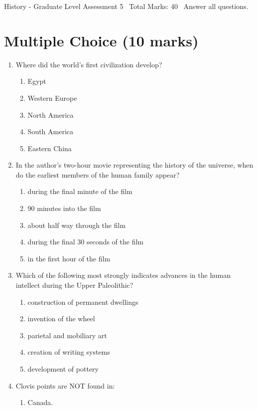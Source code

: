 \documentclass[12pt]{article}
\begin{document}
\begin{center}
History - Graduate Level Assessment 5 \
Total Marks: 40 \
Answer all questions.
\end{center}

\section*{Multiple Choice (10 marks)}
\begin{enumerate}[label=\arabic*.]
\item Where did the world's first civilization develop?
\begin{enumerate}[label=(\alph*)]
    \item Egypt
    \item Western Europe
    \item North America
    \item South America
    \item Eastern China
\end{enumerate}
\item In the author's two-hour movie representing the history of the universe, when do the earliest members of the human family appear?
\begin{enumerate}[label=(\alph*)]
    \item during the final minute of the film
    \item 90 minutes into the film
    \item about half way through the film
    \item during the final 30 seconds of the film
    \item in the first hour of the film
\end{enumerate}
\item Which of the following most strongly indicates advances in the human intellect during the Upper Paleolithic?
\begin{enumerate}[label=(\alph*)]
    \item construction of permanent dwellings
    \item invention of the wheel
    \item parietal and mobiliary art
    \item creation of writing systems
    \item development of pottery
\end{enumerate}
\item Clovis points are NOT found in:
\begin{enumerate}[label=(\alph*)]
    \item Canada.

\end{enumerate}
\end{enumerate}
\end{document}
